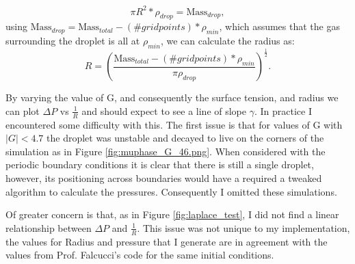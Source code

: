\documentclass[]{article}
\begin{document}
\begin{equation}
\pi R^2 * \rho_{drop} = \text{Mass}_{drop},
\end{equation}
using $ \text{Mass}_{drop} = \text{Mass}_{total}-(\# grid points)*\rho_{min}$, which assumes that the gas surrounding the droplet is all at $\rho_{min}$, we can calculate the radius as:
\begin{equation}
R = \left(\frac{ \text{Mass}_{total}-(\# grid points)*\rho_{min}}{\pi \rho_{drop}}\right)^\frac{1}{2}.
\end{equation}

By varying the value of G, and consequently the surface tension, and radius we can plot $\Delta P$ vs $\frac{1}{R}$ and should expect to see a line of slope $\gamma$. In practice I encountered some difficulty with this. The first issue is that for values of G with $|G|<4.7$ the droplet was unstable and decayed to live on the corners of the simulation as in Figure \ref{fig:muphase_G_46.png}. When considered with the periodic boundary conditions it is clear that there is still a single droplet, however, its positioning across boundaries would have a required a tweaked algorithm to calculate the pressures. Consequently I omitted these simulations. 

Of greater concern is that, as in Figure \ref{fig:laplace_test}, I did not find a linear relationship between $\Delta P$ and $\frac{1}{R}$. This issue was not unique to my implementation, the values for Radius and pressure that I generate are in agreement with the values from Prof. Falcucci's code for the same initial conditions. 
\end{document}
